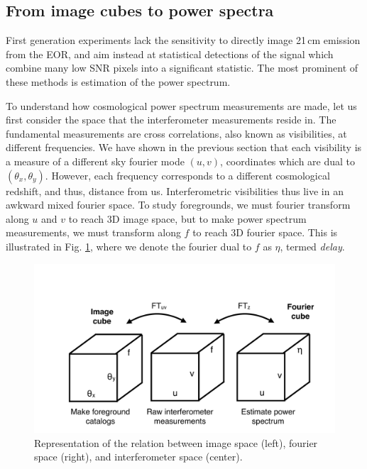 \subsection{From image cubes to power spectra}

First generation experiments lack the sensitivity to directly image 21\,cm emission from the EOR, and aim instead at statistical detections of the signal which combine many low SNR pixels into a significant statistic. The most prominent of these methods is estimation of the power spectrum.

To understand how cosmological power spectrum measurements are made, let us first consider the space that the interferometer measurements reside in. The fundamental measurements are cross correlations, also known as visibilities, at different frequencies. We have shown in the previous section that each visibility is a measure of a different sky fourier mode $(u,v)$, coordinates which are dual to $(\theta_x,\theta_y)$. However, each frequency corresponds to a different cosmological redshift, and thus, distance from us. Interferometric visibilities thus live in an awkward mixed fourier space. To study foregrounds, we must fourier transform along $u$ and $v$ to reach 3D image space, but to make power spectrum measurements, we must transform along $f$ to reach 3D fourier space. This is illustrated in Fig. \ref{fig:ifospace}, where we denote the fourier dual to $f$ as $\eta$, termed \textit{delay}.

\begin{figure}[h]
    \centering
    \includegraphics[width=1\textwidth]{chap0_intro/ifo_space.pdf}
    \caption{Representation of the relation between image space (left), fourier space (right), and interferometer space (center).}
    \label{fig:ifospace}
\end{figure}

